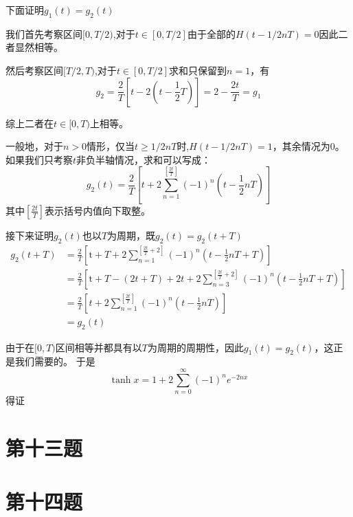 \documentclass[a4paper]{ctexart}
\begin{document}
下面证明$g_1(t)=g_2(t)$

我们首先考察区间$[0,T/2)$,对于$t\in [0,T/2]$由于全部的$H(t-1/2nT)=0$因此二者显然相等。

然后考察区间$[T/2,T)$,对于$t\in [0,T/2]$求和只保留到$n=1$，有
$$
    g_2=\frac{2}{T}\left[ t-2\left( t-\frac{1}{2}T \right) \right] =2-\frac{2t}{T}=g_1
$$

综上二者在$t\in [0,T)$上相等。

一般地，对于$n>0$情形，仅当$t\geq 1/2nT$时,$H(t-1/2nT)=1$，其余情况为0。如果我们只考察$t$非负半轴情况，求和可以写成：
$$
    g_2\left( t \right) =\frac{2}{T}\left[ t +2\sum_{n=1}^{\left[ \frac{2t}{T} \right]}{\left( -1 \right)}^n\left( t-\frac{1}{2}nT \right) \right]
$$
其中$\left[ \frac{2t}{T} \right]$表示括号内值向下取整。

接下来证明$g_2(t)$也以$T$为周期，既$g_2(t)=g_2(t+T)$
$$
    \begin{aligned}
        g_2\left( t+T \right)
         & =\frac{2}{T}\left[ \text{t}+T+2\sum_{n=1}^{\left[ \frac{2t}{T}+2 \right]}{\left( -1 \right)}^n\left( t-\frac{1}{2}nT+T \right) \right]                         \\
         & =\frac{2}{T}\left[ \text{t}+T-\left( 2t+T \right) +2t+2\sum_{n=3}^{\left[ \frac{2t}{T}+2 \right]}{\left( -1 \right)}^n\left( t-\frac{1}{2}nT+T \right) \right] \\
         & =\frac{2}{T}\left[ t+2\sum_{n=1}^{\left[ \frac{2t}{T} \right]}{\left( -1 \right)}^n\left( t-\frac{1}{2}nT \right) \right]                                      \\
         & =g_2\left( t \right)
    \end{aligned}
$$

由于在$[0,T)$区间相等并都具有以$T$为周期的周期性，因此$g_1(t)=g_2(t)$，这正是我们需要的。
于是
$$
    \tanh x=1+2 \sum_{n=0}^{\infty}(-1)^{n} e^{-2 n x}
$$
得证


\section{第十三题}
\section{第十四题}
\end{document}
